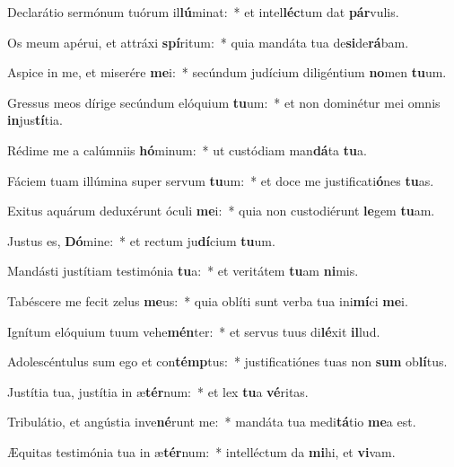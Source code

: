 \item Declarátio sermónum tuórum il\textbf{lú}minat:~* et intel\textbf{léc}tum dat \textbf{pár}vulis.
\item Os meum apérui, et attráxi \textbf{spí}ritum:~* quia mandáta tua de\textbf{si}de\textbf{rá}bam.
\item Aspice in me, et miserére \textbf{me}i:~* secúndum judícium diligéntium \textbf{no}men \textbf{tu}um.
\item Gressus meos dírige secúndum elóquium \textbf{tu}um:~* et non dominétur mei omnis \textbf{in}jus\textbf{tí}tia.
\item Rédime me a calúmniis \textbf{hó}minum:~* ut custódiam man\textbf{dá}ta \textbf{tu}a.
\item Fáciem tuam illúmina super servum \textbf{tu}um:~* et doce me justificati\textbf{ó}nes \textbf{tu}as.
\item Exitus aquárum deduxérunt óculi \textbf{me}i:~* quia non custodiérunt \textbf{le}gem \textbf{tu}am.
\item Justus es, \textbf{Dó}mine:~* et rectum ju\textbf{dí}cium \textbf{tu}um.
\item Mandásti justítiam testimónia \textbf{tu}a:~* et veritátem \textbf{tu}am \textbf{ni}mis.
\item Tabéscere me fecit zelus \textbf{me}us:~* quia oblíti sunt verba tua ini\textbf{mí}ci \textbf{me}i.
\item Ignítum elóquium tuum vehe\textbf{mén}ter:~* et servus tuus di\textbf{lé}xit \textbf{il}lud.
\item Adolescéntulus sum ego et con\textbf{témp}tus:~* justificatiónes tuas non \textbf{sum} ob\textbf{lí}tus.
\item Justítia tua, justítia in æ\textbf{tér}num:~* et lex \textbf{tu}a \textbf{vé}ritas.
\item Tribulátio, et angústia inve\textbf{né}runt me:~* mandáta tua medi\textbf{tá}tio \textbf{me}a est.
\item Æquitas testimónia tua in æ\textbf{tér}num:~* intelléctum da \textbf{mi}hi, et \textbf{vi}vam.
